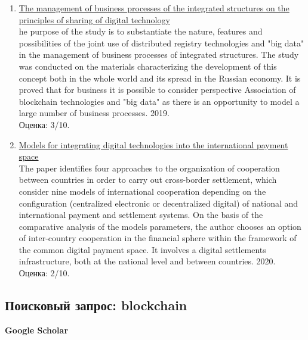 \documentclass[a4paper, 12pt]{report}		%
\begin{document}
\begin{enumerate}
\item \href{https://ruslan.library.spbstu.ru/pwb/detail?db=EBOOKS&id=RU%5CSPSTU%5Cedoc%5C61996}{The management of business processes of the integrated structures on the principles of sharing of digital technology}\\
he purpose of the study is to substantiate the nature, features and possibilities of the joint use of distributed registry technologies and "big data" in the management of business processes of integrated structures. The study was conducted on the materials characterizing the development of this concept both in the whole world and its spread in the Russian economy. It is proved that for business it is possible to consider perspective Association of blockchain technologies and "big data" as there is an opportunity to model a large number of business processes. 2019.\\
Оценка: 3/10.
\item \href{https://ruslan.library.spbstu.ru/pwb/detail?db=EBOOKS&id=RU%5CSPSTU%5Cedoc%5C64106}{Models for integrating digital technologies into the international payment space}\\
The paper identifies four approaches to the organization of cooperation between countries in order to carry out cross-border settlement, which consider nine models of international cooperation depending on the configuration (centralized electronic or decentralized digital) of national and international payment and settlement systems. On the basis of the comparative analysis of the models parameters, the author chooses an option of inter-country cooperation in the financial sphere within the framework of the common digital payment space. It involves a digital settlements infrastructure, both at the national level and between countries. 2020.\\
Оценка: 2/10.
\end{enumerate}

\subsection*{Поисковый запрос: blockchain}

\textbf{Google Scholar}
\end{document}
